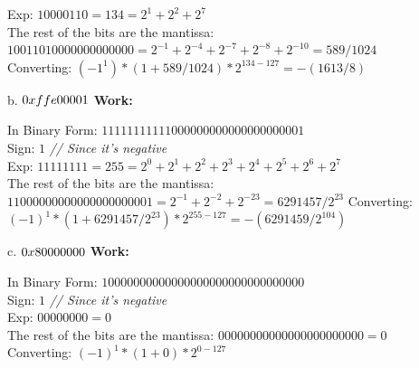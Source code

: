 \documentclass[11pt]{article}
\begin{document}
\begin{enumerate}
\begin{center}
        Exp: $10000110 = 134 = 2^1 + 2^2 + 2^7$\\
        The rest of the bits are the mantissa: $1001 1010 0000 0000 0000 = 2^{-1} + 2^{-4} + 2^{-7} + 2^{-8} + 2^{-10} = 589/1024$\\
        Converting: $(-1^1) * (1 + 589/1024) * 2^{134-127} = -(1613/8)$\\
    \end{center}

    b. $0xffe00001\\$
    \textbf{Work:}
    \begin{center}
        In Binary Form: $1111 1111 1110 0000 0000 0000 0000 0001$\\
        Sign: $1$ \textit{// Since it's negative}\\
        Exp: $11111111 = 255 = 2^0 + 2^1 + 2^2 + 2^3 + 2^4 + 2^5 + 2^6 + 2^7$\\
        The rest of the bits are the mantissa: $110 0000 0000 0000 0000 0001 = 2^{-1} + 2^{-2} + 2^{-23} = 6291457 / 2^{23}$
        Converting: $(-1)^1 * (1 + 6291457 / 2^{23}) * 2^{255-127} = -(6291459/2^{104})$\\
    \end{center}

    c. $0x80000000\\$
    \textbf{Work:}
    \begin{center}
        In Binary Form: $1000 0000 0000 0000 0000 0000 0000 0000$\\
        Sign: $1$ \textit{// Since it's negative}\\
        Exp: $00000000 = 0$\\
        The rest of the bits are the mantissa: $000 0000 0000 0000 0000 0000 = 0$\\
        Converting: $(-1)^1 * (1 + 0) * 2^{0-127}$\\
    \end{center}


\end{enumerate}
\end{document}
